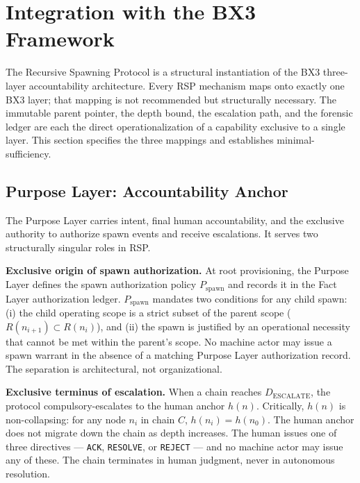 \section{Integration with the BX3 Framework}
\label{sec:rs-integration}

The Recursive Spawning Protocol is a structural instantiation of the BX3 three-layer accountability architecture. Every RSP mechanism maps onto exactly one BX3 layer; that mapping is not recommended but structurally necessary. The immutable parent pointer, the depth bound, the escalation path, and the forensic ledger are each the direct operationalization of a capability exclusive to a single layer. This section specifies the three mappings and establishes minimal-sufficiency.

\subsection{Purpose Layer: Accountability Anchor}
\label{sec:rs-purpose-anchor}

The Purpose Layer carries intent, final human accountability, and the exclusive authority to authorize spawn events and receive escalations. It serves two structurally singular roles in RSP.

\medskip
\noindent\textbf{Exclusive origin of spawn authorization.} At root provisioning, the Purpose Layer defines the spawn authorization policy $P_{\mathrm{spawn}}$ and records it in the Fact Layer authorization ledger. $P_{\mathrm{spawn}}$ mandates two conditions for any child spawn: (i) the child operating scope is a strict subset of the parent scope ($R(n_{i+1}) \subset R(n_i)$), and (ii) the spawn is justified by an operational necessity that cannot be met within the parent's scope. No machine actor may issue a spawn warrant in the absence of a matching Purpose Layer authorization record. The separation is architectural, not organizational.

\medskip
\noindent\textbf{Exclusive terminus of escalation.} When a chain reaches $D_{\mathrm{ESCALATE}}$, the protocol compulsory-escalates to the human anchor $h(n)$. Critically, $h(n)$ is non-collapsing: for any node $n_i$ in chain $C$, $h(n_i) = h(n_0)$. The human anchor does not migrate down the chain as depth increases. The human issues one of three directives --- \texttt{ACK}, \texttt{RESOLVE}, or \texttt{REJECT} --- and no machine actor may issue any of these. The chain terminates in human judgment, never in autonomous resolution.

